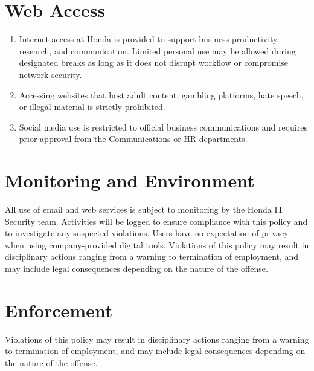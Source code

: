 \section{Web Access}

\begin{enumerate}
    \item \textbf{}Internet access at Honda is provided to support business productivity, research, and communication. Limited personal use may be allowed during designated breaks as long as it does not disrupt workflow or compromise network security.

    \item \textbf{}Accessing websites that host adult content, gambling platforms, hate speech, or illegal material is strictly prohibited.

    \item \textbf{}Social media use is restricted to official business communications and requires prior approval from the Communications or HR departments.
    
\end{enumerate}

\section{Monitoring and Environment}

All use of email and web services is subject to monitoring by the Honda IT Security team. Activities will be logged to ensure compliance with this policy and to investigate any suspected violations. Users have no expectation of privacy when using company-provided digital tools. Violations of this policy may result in disciplinary actions ranging from a warning to termination of employment, and may include legal consequences depending on the nature of the offense.

\section{Enforcement}
Violations of this policy may result in disciplinary actions ranging from a warning to termination of employment, and may include legal consequences depending on the nature of the offense.